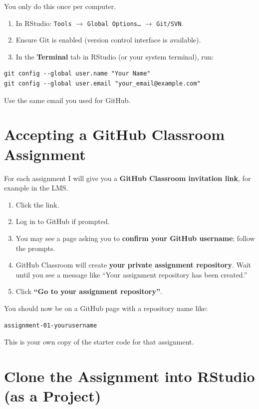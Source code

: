\documentclass[11pt]{scrartcl}
\begin{document}
You only do this once per computer.

\begin{enumerate}[label=\arabic*., nosep]
  \item In RStudio: \texttt{Tools} $\rightarrow$ \texttt{Global Options\ldots} $\rightarrow$ \texttt{Git/SVN}.
  \item Ensure Git is enabled (version control interface is available).
  \item In the \textbf{Terminal} tab in RStudio (or your system terminal), run:
\end{enumerate}

\begin{verbatim}
git config --global user.name "Your Name"
git config --global user.email "your_email@example.com"
\end{verbatim}

Use the same email you used for GitHub.

\section{Accepting a GitHub Classroom Assignment}

For each assignment I will give you a \textbf{GitHub Classroom invitation link}, for example in the LMS.

\begin{enumerate}[label=\arabic*., nosep]
  \item Click the link.
  \item Log in to GitHub if prompted.
  \item You may see a page asking you to \textbf{confirm your GitHub username}; follow the prompts.
  \item GitHub Classroom will create \textbf{your private assignment repository}. Wait until you see a message like ``Your assignment repository has been created.''
  \item Click \textbf{``Go to your assignment repository''}.
\end{enumerate}

You should now be on a GitHub page with a repository name like:
\begin{center}
\texttt{assignment-01-yourusername}
\end{center}

This is your own copy of the starter code for that assignment.

\section{Clone the Assignment into RStudio (as a Project)}
\end{document}
